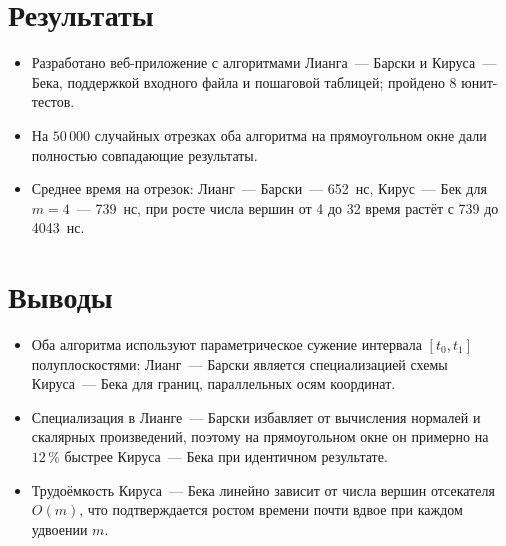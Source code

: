 \documentclass[11pt,a4paper]{article}
\begin{document}
\section{Результаты}
\begin{itemize}[label=--, leftmargin=1.5em, itemsep=0.2em, topsep=0.2em]
  \item Разработано веб-приложение с алгоритмами Лианга~— Барски и Кируса~— Бека,
        поддержкой входного файла и пошаговой таблицей; пройдено 8 юнит-тестов.
  \item На $50\,000$ случайных отрезках оба алгоритма на прямоугольном окне дали
        полностью совпадающие результаты.
  \item Среднее время на отрезок: Лианг~— Барски~— 652~нс, Кирус~— Бек для $m = 4$~—
        739~нс, при росте числа вершин от 4 до 32 время растёт с 739 до 4043~нс.
\end{itemize}

\section{Выводы}
\begin{itemize}[label=--, leftmargin=1.5em, itemsep=0.2em, topsep=0.2em]
  \item Оба алгоритма используют параметрическое сужение интервала $[t_0, t_1]$
        полуплоскостями: Лианг~— Барски является специализацией схемы Кируса~— Бека
        для границ, параллельных осям координат.
  \item Специализация в Лианге~— Барски избавляет от вычисления нормалей и скалярных
        произведений, поэтому на прямоугольном окне он примерно на $12\,\%$ быстрее
        Кируса~— Бека при идентичном результате.
  \item Трудоёмкость Кируса~— Бека линейно зависит от числа вершин отсекателя $O(m)$,
        что подтверждается ростом времени почти вдвое при каждом удвоении $m$.
\end{itemize}
\end{document}
